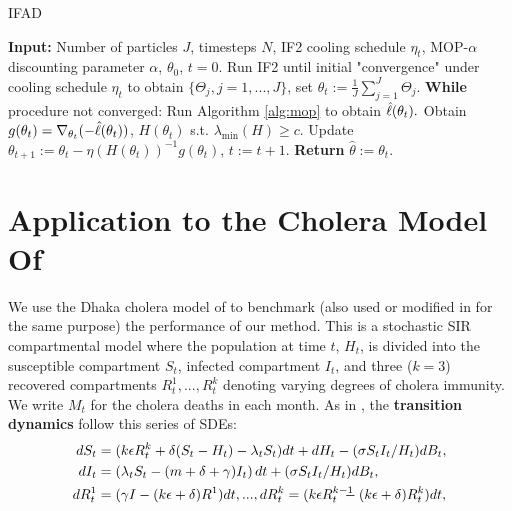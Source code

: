 \documentclass[9pt,twocolumn,twoside]{pnas-new}
\begin{document}
\begin{algorithm}[H]
	\caption{IFAD}
    \label{alg:ifad}
	    \textbf{Input:} Number of particles $J$, timesteps $N$, IF2 cooling schedule $\eta_t$, MOP-$\alpha$ discounting parameter $\alpha$, $\theta_0$, $t=0.$\newline
        Run IF2 until initial "convergence" under cooling schedule $\eta_t$ to obtain $\{\Theta_j, j=1,...,J\}$, set $\theta_t := \frac{1}{J}\sum_{j=1}^J \Theta_j.$\newline
		\textbf{While} procedure not converged: \newline
		\hspace*{4mm} Run Algorithm \ref{alg:mop} to obtain $\hat{\ell}(\theta_t).$ \newline
		\hspace*{4mm} Obtain $g(\theta_t) = \nabla_{\theta_t} (-\hat{\ell}(\theta_t))$, $H(\theta_t)$ s.t. $\lambda_{\min}(H) \geq c$. \newline
		\hspace*{4mm} Update $\theta_{t+1} := \theta_t - \eta (H(\theta_t))^{-1} g(\theta_t)$, $t:=t+1.$ \newline
		\textbf{Return} $\hat{\theta} := \theta_t.$
\end{algorithm}

\section{Application to the Cholera Model Of \cite{king08}}


We use the Dhaka cholera model of \cite{king08} to benchmark (also used or modified in \cite{ionides15, wood16, wycoff2024voronoi} for the same purpose) the performance of our method. This is a stochastic SIR compartmental model where the population at time $t$, $H_t$, is divided into the susceptible compartment $S_t$, infected compartment $I_t$, and three ($k=3$) recovered compartments $R^1_t, ..., R^k_t$ denoting varying degrees of cholera immunity. We write $M_t$ for the cholera deaths in each month. As in \cite{king08, ionides15}, the \textbf{transition dynamics} follow this series of SDEs:
\vspace*{-1mm}
\begin{align*}
    d S_t&=(k \epsilon R^k_t+\delta(S_t-H_t)-\lambda_t S_t) d t+d H_t-({\sigma S_t I_t}/{H_t}) d B_t, \\
    d I_t&=\left(\lambda_t S_t-(m+\delta+\gamma) I_t\right) d t+({\sigma S_t I_t}/{H_t}) d B_t, \\
    d R^1_t&=(\gamma I-(k \epsilon+\delta) R^1) d t,..., 
    d R^k_t=(k \epsilon R^{k-1}_t\hspace{-3mm}-(k \epsilon+\delta) R^k_t) d t,
    \vspace*{-2mm}
\end{align*}
\end{document}
